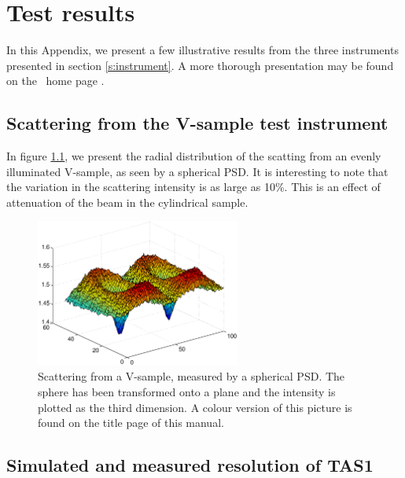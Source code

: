 
\chapter{Test results}
\label{testresults}

In this Appendix, we present a few illustrative
results from the three instruments presented in 
section \ref{s:instrument}. A more thorough presentation
may be found on the \MCS\ home page \cite{mcstas_webpage}.

\section{Scattering from the V-sample test instrument}
\label{s:vanadium-result}

In figure \ref{f:V-results}, we present the radial distribution 
of the scatting from an evenly illuminated V-sample,
as seen by a spherical PSD.
It is interesting to note that the variation in the
scattering intensity is as large as 10\%. This is an effect
of attenuation of the beam in the cylindrical sample.

\begin{figure}
  \begin{center}
    \includegraphics[width=0.6\textwidth]{figures/vanadium-surf-2.eps}
  \end{center}
\caption{Scattering from a V-sample, measured by a spherical
  PSD. The sphere has been transformed onto a plane and the intensity is
  plotted as the third dimension. A colour version of this picture is
  found on the title page of this manual.}
\label{f:V-results}
\end{figure}

\section{Simulated and measured resolution of TAS1}
\label{data:TAS1}

